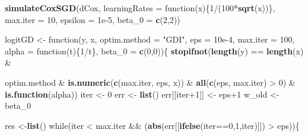 \documentclass[]{article}
\newenvironment{Shaded}{\begin{snugshade}}{\end{snugshade}}
\newcommand{\KeywordTok}[1]{\textcolor[rgb]{0.13,0.29,0.53}{\textbf{{#1}}}}
\newcommand{\DataTypeTok}[1]{\textcolor[rgb]{0.13,0.29,0.53}{{#1}}}
\newcommand{\DecValTok}[1]{\textcolor[rgb]{0.00,0.00,0.81}{{#1}}}
\newcommand{\FloatTok}[1]{\textcolor[rgb]{0.00,0.00,0.81}{{#1}}}
\newcommand{\StringTok}[1]{\textcolor[rgb]{0.31,0.60,0.02}{{#1}}}
\newcommand{\NormalTok}[1]{{#1}}
\begin{document}
\begin{Shaded}
\begin{Highlighting}[]
\KeywordTok{simulateCoxSGD}\NormalTok{(dCox, }\DataTypeTok{learningRates =} \NormalTok{function(x)\{}\DecValTok{1}\NormalTok{/(}\DecValTok{100}\NormalTok{*}\KeywordTok{sqrt}\NormalTok{(x))\},}
               \DataTypeTok{max.iter =} \DecValTok{10}\NormalTok{, }\DataTypeTok{epsilon =} \FloatTok{1e-5}\NormalTok{, }\DataTypeTok{beta_0 =} \KeywordTok{c}\NormalTok{(}\DecValTok{2}\NormalTok{,}\DecValTok{2}\NormalTok{))}
\end{Highlighting}
\end{Shaded}

\begin{Shaded}
\begin{Highlighting}[]
\NormalTok{logitGD <-}\StringTok{ }\NormalTok{function(y, x, }\DataTypeTok{optim.method =} \StringTok{"GDI"}\NormalTok{, }\DataTypeTok{eps =} \FloatTok{10e-4}\NormalTok{,}
                    \DataTypeTok{max.iter =} \DecValTok{100}\NormalTok{, }\DataTypeTok{alpha =} \NormalTok{function(t)\{}\DecValTok{1}\NormalTok{/t\}, }\DataTypeTok{beta_0 =} \KeywordTok{c}\NormalTok{(}\DecValTok{0}\NormalTok{,}\DecValTok{0}\NormalTok{))\{}
  \KeywordTok{stopifnot}\NormalTok{(}\KeywordTok{length}\NormalTok{(y) ==}\StringTok{ }\KeywordTok{length}\NormalTok{(x) &}\StringTok{ }\NormalTok{optim.method %in%}\StringTok{ }\KeywordTok{c}\NormalTok{(}\StringTok{"GDI"}\NormalTok{, }\StringTok{"GDII"}\NormalTok{, }\StringTok{"SGDI"}\NormalTok{)}
            \NormalTok{&}\StringTok{ }\KeywordTok{is.numeric}\NormalTok{(}\KeywordTok{c}\NormalTok{(max.iter, eps, x)) &}\StringTok{ }\KeywordTok{all}\NormalTok{(}\KeywordTok{c}\NormalTok{(eps, max.iter) >}\StringTok{ }\DecValTok{0}\NormalTok{) &}
\StringTok{              }\KeywordTok{is.function}\NormalTok{(alpha))}
  \NormalTok{iter <-}\StringTok{ }\DecValTok{0}
  \NormalTok{err <-}\StringTok{ }\KeywordTok{list}\NormalTok{()}
  \NormalTok{err[[iter}\DecValTok{+1}\NormalTok{]] <-}\StringTok{ }\NormalTok{eps}\DecValTok{+1}
  \NormalTok{w_old <-}\StringTok{ }\NormalTok{beta_0}

  \NormalTok{res <-}\KeywordTok{list}\NormalTok{()}
  \NormalTok{while(iter <}\StringTok{ }\NormalTok{max.iter &&}\StringTok{ }\NormalTok{(}\KeywordTok{abs}\NormalTok{(err[[}\KeywordTok{ifelse}\NormalTok{(iter==}\DecValTok{0}\NormalTok{,}\DecValTok{1}\NormalTok{,iter)]]) >}\StringTok{ }\NormalTok{eps))\{}

}
\end{Highlighting}
\end{Shaded}
\end{document}

